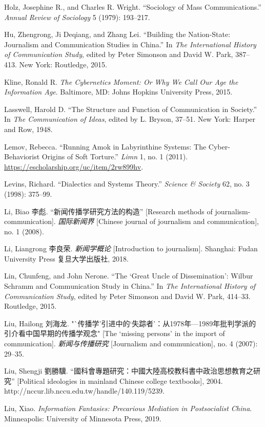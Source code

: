 \documentclass{tufte-handout}
\begin{document}
\begin{hangparas}{.25in}{1}
\begin{CJK*}{UTF8}{gbsn}
Holz, Josephine R., and Charles R. Wright. ``Sociology of Mass
Communications.'' \emph{Annual Review of Sociology} 5 (1979): 193--217.

Hu, Zhengrong, Ji Deqiang, and Zhang Lei. ``Building the Nation-State:
Journalism and Communication Studies in China.'' In \emph{The
International History of Communication Study}, edited by Peter Simonson
and David W. Park, 387--413. New York: Routledge, 2015.

Kline, Ronald R. \emph{The Cybernetics Moment: Or Why We Call Our Age
the Information Age}. Baltimore, MD: Johns Hopkins University Press,
2015.

Lasswell, Harold D. ``The Structure and Function of Communication in
Society.'' In \emph{The Communication of Ideas}, edited by L. Bryson,
37--51. New York: Harper and Row, 1948.

Lemov, Rebecca. ``Running Amok in Labyrinthine Systems: The
Cyber-Behaviorist Origins of Soft Torture.'' \emph{Limn} 1, no. 1
(2011). \url{https://escholarship.org/uc/item/2rw899hv}.

Levins, Richard. ``Dialectics and Systems Theory.'' \emph{Science \&
Society} 62, no. 3 (1998): 375--99.

Li, Biao 李彪. ``新闻传播学研究方法的构造'' {[}Research methods of
journalism-communication{]}. \emph{国际新闻界} {[}Chinese journal of
journalism and communication{]}, no. 1 (2008).

Li, Liangrong 李良荣. \emph{新闻学概论} {[}Introduction to
journalism{]}. Shanghai: Fudan University Press 复旦大学出版社, 2018.

Lin, Chunfeng, and John Nerone. ``The `Great Uncle of Dissemination':
Wilbur Schramm and Communication Study in China.'' In \emph{The
International History of Communication Study}, edited by Peter Simonson
and David W. Park, 414--33. Routledge, 2015.

Liu, Hailong 刘海龙.
"`传播学'引进中的`失踪者'：从1978年---1989年批判学派的引介看中国早期的传播学观念"
{[}The `missing persons' in the import of communication{]}.
\emph{新闻与传播研究} {[}Journalism and communication{]}, no. 4 (2007):
29--35.

Liu, Shengji 劉勝驥.
``國科會專題研究：中國大陸高校教科書中政治思想教育之研究'' {[}Political
ideologies in mainland Chinese college textbooks{]}, 2004.
http://nccur.lib.nccu.edu.tw/handle/140.119/5239.

Liu, Xiao. \emph{Information Fantasies: Precarious Mediation in
Postsocialist China}. Minneapolis: University of Minnesota Press, 2019.


\end{CJK*}
\end{hangparas}
\end{document}
